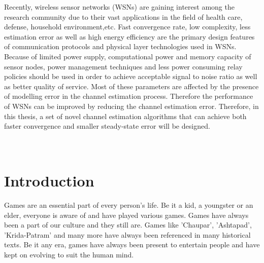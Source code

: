 \documentclass[12pt]{article}
\begin{document}
		Recently, wireless sensor networks (WSNs) are gaining interest among the research community due to their vast applications in the field of health care, defense, household environment,etc. Fast convergence rate, low complexity, less estimation error as well as high energy efficiency are the primary design features of communication protocols and physical layer technologies used in WSNs. Because of limited power supply, computational power and memory capacity of sensor nodes, power management techniques and less power consuming relay policies should be used in order to achieve acceptable signal to noise ratio as well as better quality of service. Most of these parameters are affected by the presence of modelling error in the channel estimation process. Therefore the performance of WSNs can be improved by reducing the channel estimation error. Therefore, in this thesis, a set of
		novel channel estimation algorithms that can achieve both faster convergence and smaller steady-state error will be designed.  \\
		\\
		\\
		
		
		\clearpage
		\fi
		
		\tableofcontents
		\clearpage
		\section{Introduction}
		\setlength{\parindent}{10ex}
		Games are an essential part of every person's life. Be it a kid, a youngster or an elder, everyone is aware of and have played various games. Games have always been a part of our culture and they still are. Games like 'Chaupar', 'Ashtapad', 'Krida-Patram' and many more have always been referenced in many historical texts. Be it any era, games have always been present to entertain people and have kept on evolving to suit the human mind.
\end{document}
